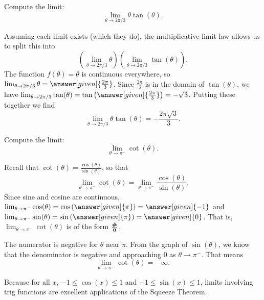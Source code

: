 \documentclass{ximera}
\begin{document}
\begin{example}
	Compute the limit: \[ \lim_{\theta \to 2\pi/3} \theta \tan(\theta). \]
	\begin{explanation}
		Assuming each limit exists (which they do), the multiplicative limit law allows us to split this into \[ \left(\lim_{\theta\to 2\pi/3} \theta \right) \left(\lim_{\theta\to 2\pi/3} \tan(\theta) \right). \]
		The function $f(\theta) = \theta$ is continuous everywhere, so $\lim_{\theta\to 2\pi/3} \theta = \answer[given]{\frac{2\pi}{3}}$.  Since $\frac{2 \pi}{3}$ is in the domain
		of $\tan(\theta)$, we have $\lim_{\theta\to 2\pi/3} \tan(\theta) = \tan \left( \answer[given]{\frac{2 \pi}{3}} \right) = - \sqrt{3}$.  Putting these together we find
		\[ \lim_{\theta\to 2\pi/3} \theta \tan(\theta) = - \frac{2 \pi \sqrt{3}}{3}. \]
	\end{explanation}
\end{example}


\begin{example}
	Compute the limit: \[ \lim_{\theta \to \pi^-} \cot(\theta). \]
	\begin{explanation}
		Recall that $\cot(\theta) = \frac{\cos(\theta)}{\sin(\theta)}$, so that \[ \lim_{\theta \to \pi^-} \cot(\theta) = \lim_{\theta \to \pi^-} \frac{\cos(\theta)}{\sin(\theta)}.\]
		Since sine and cosine are continuous, $\lim_{\theta \to \pi^-} \cos(\theta) = \cos\left( \answer[given]{\pi} \right)= \answer[given]{-1}$ and 
		$\lim_{\theta \to \pi^-} \sin(\theta) = \sin\left( \answer[given]{\pi} \right)  = \answer[given]{0}$.
		That is, $\lim_{\theta \to \pi^-} \cot(\theta)$ is of the form $\boldsymbol{\tfrac{\#}{0}}$.
		
		The numerator is negative for $\theta$ near $\pi$.  From the graph of $\sin(\theta)$, we know that the denominator is negative and approaching $0$ as $\theta \to \pi^{-}$.
		That means \[ \lim_{\theta \to \pi^-} \cot(\theta) = -\infty. \]
	\end{explanation}
\end{example}

Because for all $x$, $-1\leq\cos(x)\leq 1$ and $-1\leq\sin(x)\leq 1$, limits involving trig functions are excellent applications of the Squeeze Theorem.
\end{document}

